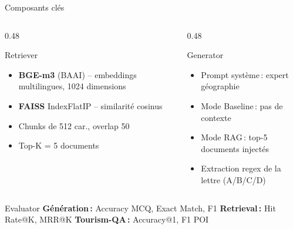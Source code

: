 \documentclass[aspectratio=169, 12pt]{beamer}
\begin{document}
\begin{frame}{Composants cl\'es}
  \begin{columns}[T]
    \begin{column}{0.48\textwidth}
      \begin{block}{Retriever}
        \begin{itemize}
          \item \textbf{BGE-m3} (BAAI) -- embeddings multilingues, 1024 dimensions
          \item \textbf{FAISS} IndexFlatIP -- similarit\'e cosinus
          \item Chunks de 512 car., overlap 50
          \item Top-K = 5 documents
        \end{itemize}
      \end{block}
    \end{column}
    \begin{column}{0.48\textwidth}
      \begin{block}{Generator}
        \begin{itemize}
          \item Prompt syst\`eme\,: expert g\'eographie
          \item Mode Baseline\,: pas de contexte
          \item Mode RAG\,: top-5 documents inject\'es
          \item Extraction regex de la lettre (A/B/C/D)
        \end{itemize}
      \end{block}
    \end{column}
  \end{columns}

  \vspace{0.2cm}

  \begin{block}{Evaluator}
    \small
    \textbf{G\'en\'eration\,:} Accuracy MCQ, Exact Match, F1 \quad
    \textbf{Retrieval\,:} Hit Rate@K, MRR@K \quad
    \textbf{Tourism-QA\,:} Accuracy@1, F1 POI
  \end{block}
\end{frame}
\end{document}
